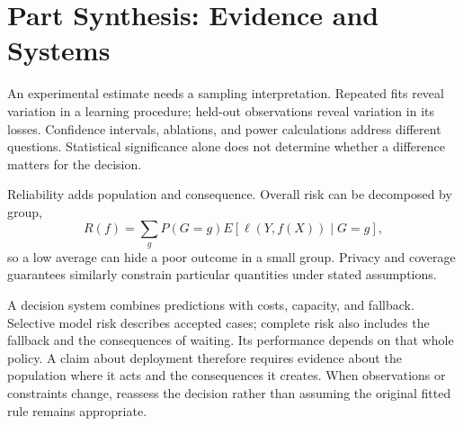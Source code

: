 \chapter*{Part Synthesis: Evidence and Systems}

An experimental estimate needs a sampling interpretation. Repeated fits reveal variation in a learning procedure; held-out observations reveal variation in its losses. Confidence intervals, ablations, and power calculations address different questions. Statistical significance alone does not determine whether a difference matters for the decision.

Reliability adds population and consequence. Overall risk can be decomposed by group,
\[
R(f)=\sum_gP(G=g)E[\ell(Y,f(X))\mid G=g],
\]
so a low average can hide a poor outcome in a small group. Privacy and coverage guarantees similarly constrain particular quantities under stated assumptions.

A decision system combines predictions with costs, capacity, and fallback. Selective model risk describes accepted cases; complete risk also includes the fallback and the consequences of waiting. Its performance depends on that whole policy. A claim about deployment therefore requires evidence about the population where it acts and the consequences it creates. When observations or constraints change, reassess the decision rather than assuming the original fitted rule remains appropriate.

\clearpage
{\pagestyle{empty}\cleardoublepage}
